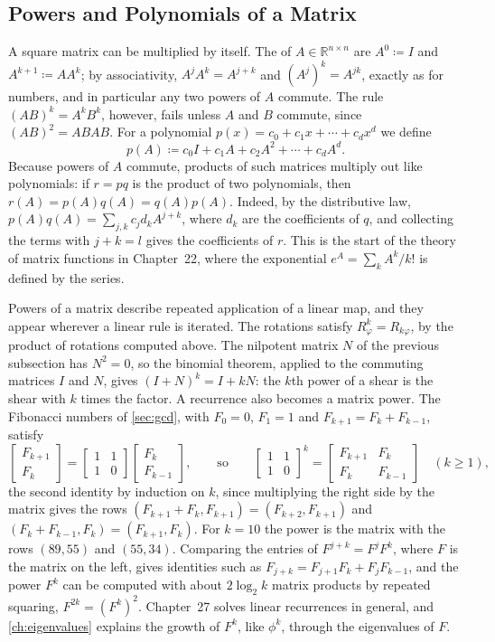 \subsection{Powers and Polynomials of a Matrix}

A square matrix can be multiplied by itself. The  of $A\in\mathbb R^{n\times n}$ are $A^0\coloneqq I$ and $A^{k+1}\coloneqq AA^k$; by associativity, $A^jA^k=A^{j+k}$ and $(A^j)^k=A^{jk}$, exactly as for numbers, and in particular any two powers of $A$ commute. The rule $(AB)^k=A^kB^k$, however, fails unless $A$ and $B$ commute, since $(AB)^2=ABAB$. For a polynomial $p(x)=c_0+c_1x+\cdots+c_dx^d$ we define
\[
p(A)\coloneqq c_0I+c_1A+c_2A^2+\cdots+c_dA^d .
\]
Because powers of $A$ commute, products of such matrices multiply out like polynomials: if $r=pq$ is the product of two polynomials, then $r(A)=p(A)q(A)=q(A)p(A)$. Indeed, by the distributive law, $p(A)q(A)=\sum_{j,k}c_jd_kA^{j+k}$, where $d_k$ are the coefficients of $q$, and collecting the terms with $j+k=l$ gives the coefficients of $r$. This is the start of the theory of matrix functions in Chapter~22, where the exponential $e^A=\sum_kA^k/k!$ is defined by the series.

Powers of a matrix describe repeated application of a linear map, and they appear wherever a linear rule is iterated. The rotations satisfy $R_\varphi^k=R_{k\varphi}$, by the product of rotations computed above. The nilpotent matrix $N$ of the previous subsection has $N^2=0$, so the binomial theorem, applied to the commuting matrices $I$ and $N$, gives $(I+N)^k=I+kN$: the $k$th power of a shear is the shear with $k$ times the factor. A recurrence also becomes a matrix power. The Fibonacci numbers of \cref{sec:gcd}, with $F_0=0$, $F_1=1$ and $F_{k+1}=F_k+F_{k-1}$, satisfy
\[
\begin{bmatrix}F_{k+1}\\F_k\end{bmatrix}=\begin{bmatrix}1&1\\1&0\end{bmatrix}\begin{bmatrix}F_k\\F_{k-1}\end{bmatrix},\qquad\text{so}\qquad\begin{bmatrix}1&1\\1&0\end{bmatrix}^k=\begin{bmatrix}F_{k+1}&F_k\\F_k&F_{k-1}\end{bmatrix}\quad(k\ge1),
\]
the second identity by induction on $k$, since multiplying the right side by the matrix gives the rows $(F_{k+1}+F_k,F_{k+1})=(F_{k+2},F_{k+1})$ and $(F_k+F_{k-1},F_k)=(F_{k+1},F_k)$. For $k=10$ the power is the matrix with the rows $(89,55)$ and $(55,34)$. Comparing the entries of $F^{j+k}=F^jF^k$, where $F$ is the matrix on the left, gives identities such as $F_{j+k}=F_{j+1}F_k+F_jF_{k-1}$, and the power $F^k$ can be computed with about $2\log_2k$ matrix products by repeated squaring, $F^{2k}=(F^k)^2$. Chapter~27 solves linear recurrences in general, and \cref{ch:eigenvalues} explains the growth of $F^k$, like $\phi^k$, through the eigenvalues of $F$.

